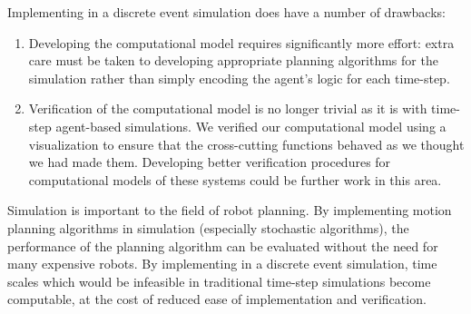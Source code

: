 \documentclass[conference,letterpaper]{IEEEtran}
\begin{document}
Implementing in a discrete event simulation does have a number of drawbacks:
\begin{enumerate}
    \item Developing the computational model requires significantly more
        effort: extra care must be taken to developing appropriate planning
        algorithms for the simulation rather than simply encoding the agent's
        logic for each time-step.
    \item Verification of the computational model is no longer trivial as it is
        with time-step agent-based simulations. We verified our computational
        model using a visualization to ensure that the cross-cutting functions
        behaved as we thought we had made them. Developing better verification
        procedures for computational models of these systems could be further
        work in this area.
\end{enumerate}

Simulation is important to the field of robot planning. By implementing motion
planning algorithms in simulation (especially stochastic algorithms), the
performance of the planning algorithm can be evaluated without the need for
many expensive robots. By implementing in a discrete event simulation, time
scales which would be infeasible in traditional time-step simulations become
computable, at the cost of reduced ease of implementation and verification.

\printbibliography
\end{document}
